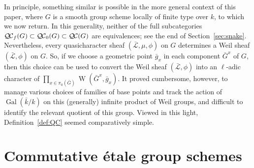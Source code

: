 \documentclass[11pt]{amsart}
\theoremstyle{plain}
\theoremstyle{definition}
\theoremstyle{remark}
\newcommand{\bFq}{\bar{k}}
\newcommand{\Fq}{k}
\DeclareMathOperator{\Gal}{Gal}
\DeclareMathOperator{\W}{W}
\newcommand{\gcs}[1]{{\mathcal{\bar #1}}}
\newcommand{\QC}{{\mathcal{Q\hskip-0.8pt C}}}
\newcommand{\QCb}{{\QC_0}}
\newcommand{\QCf}{{\QC_f}}
\newcommand{\bG}{\bar{G}}
\begin{document}
In principle, something similar is possible in the more general 
context of this paper, where $G$ is a smooth group scheme 
locally of finite type over $\Fq$, to which we now return. 
In this generality, neither of the full subcategories $\QCf(G) \subset \QCb(G) \subset \QC(G)$ are equivalences;
see the end of Section~\ref{sec:snake}.
Nevertheless, every quasicharacter sheaf $(\gcs{L},\mu,\phi)$ on $G$ 
determines a Weil sheaf $(\gcs{L},\phi)$ on $G$. 
So, if we choose a geometric point ${\bar g}_x$ in each component $\bG^x$ of $G$, then this choice can be used to convert 
the Weil sheaf $(\gcs{L},\phi)$ into an $\ell$-adic character of $\prod_{x\in \pi_0(\bG)}\W(\bG^x, {\bar g}_x)$. 
It proved cumbersome, however, to manage various 
choices of families of base points and track the action 
of $\Gal(\bFq/\Fq)$ on this (generally) infinite product of 
Weil groups, and difficult to identify the relevant quotient of this group. Viewed in this light, Definition~\ref{def:QC} seemed comparatively simple.

\section{Commutative \'etale group schemes} \label{sec:etale}

%
\end{document}
